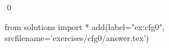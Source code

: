
\begin{ex} 
  \label{ex:cfg0}
  
  \qed
\end{ex} 
\begin{python0}
from solutions import *
add(label="ex:cfg0",
    srcfilename='exercises/cfg0/answer.tex') 
\end{python0}

